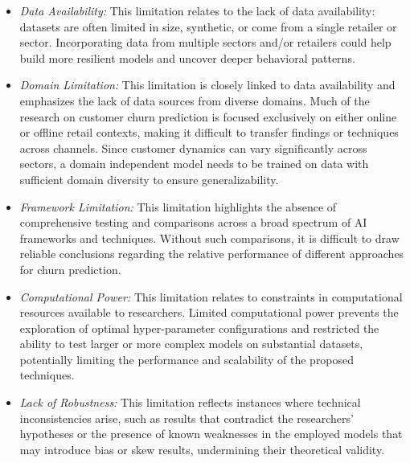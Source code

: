 \documentclass[preprint,12pt]{elsarticle}
\begin{document}
\begin{itemize}
    \item \textit{Data Availability:} This limitation relates to the lack of data availability: datasets are often limited in size, synthetic, or come from a single retailer or sector. Incorporating data from multiple sectors and/or retailers could help build more resilient models and uncover deeper behavioral patterns.

    \item \textit{Domain Limitation:} This limitation is closely linked to data availability and emphasizes the lack of data sources from diverse domains. Much of the research on customer churn prediction is focused exclusively on either online or offline retail contexts, making it difficult to transfer findings or techniques across channels. Since customer dynamics can vary significantly across sectors, a domain independent model needs to be trained on data with sufficient domain diversity to ensure generalizability.

    \item \textit{Framework Limitation:} This limitation highlights the absence of comprehensive testing and comparisons across a broad spectrum of AI frameworks and techniques. Without such comparisons, it is difficult to draw reliable conclusions regarding the relative performance of different approaches for churn prediction.

    \item \textit{Computational Power:} This limitation relates to constraints in computational resources available to researchers. Limited computational power prevents the exploration of optimal hyper-parameter configurations and restricted the ability to test larger or more complex models on substantial datasets, potentially limiting the performance and scalability of the proposed techniques.

    \item \textit{Lack of Robustness:} This limitation reflects instances where technical inconsistencies arise, such as results that contradict the researchers’ hypotheses or the presence of known weaknesses in the employed models that may introduce bias or skew results, undermining their theoretical validity.
\end{itemize}
\end{document}
